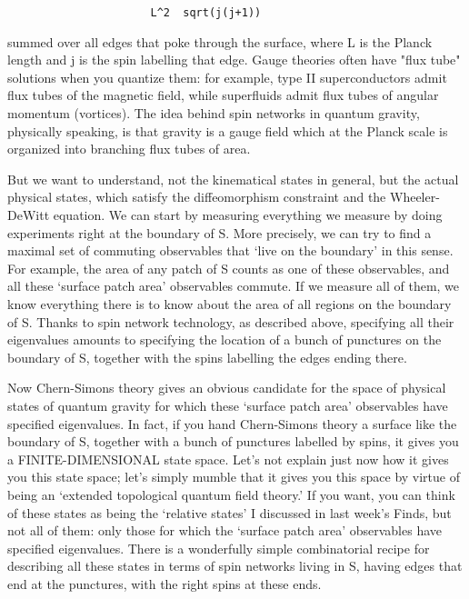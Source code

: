 \begin{verbatim}
                      L^2  sqrt(j(j+1))
\end{verbatim}
    

summed over all edges that poke through the surface, where
L is the Planck length and j is the spin labelling that edge.
Gauge theories often have "flux tube" solutions when you quantize
them: for example, type II superconductors admit flux tubes of
the magnetic field, while superfluids admit flux tubes of
angular momentum (vortices).  The idea behind spin networks in quantum
gravity, physically speaking, is that gravity is a gauge field
which at the Planck scale is organized into branching flux tubes
of area.

But we want to understand, not the kinematical states in general, but
the actual physical states, which satisfy the diffeomorphism constraint
and the Wheeler-DeWitt equation. We can start by measuring everything we
measure by doing experiments right at the boundary of S.  More precisely, we 
can try to find a maximal set of commuting observables that `live on the 
boundary' in this sense.  For example, the area of any patch of S counts 
as one of these observables, and all these `surface patch area' 
observables commute.  If we measure all of them, we know everything 
there is to know about the area of all regions on the 
boundary of S.  Thanks to spin network technology, as described above,
specifying all their eigenvalues amounts to specifying the location of 
a bunch of punctures on the boundary of S, together with the spins 
labelling the edges ending there.

Now Chern-Simons theory gives an obvious candidate for the space of
physical states of quantum gravity for which these `surface patch area' 
observables have specified eigenvalues.  In fact, if you hand Chern-Simons 
theory a surface like the boundary of S, together with a bunch of punctures
labelled by spins, it gives you a FINITE-DIMENSIONAL state space. 
Let's not explain just now how it gives you this state space; let's simply
mumble that it gives you this space by virtue of being an `extended topological
quantum field theory.'  If you want, you can think of these states as being
the `relative states' I discussed in last week's Finds, but not all of them: 
only those for which the `surface patch area' observables have specified 
eigenvalues.   There is a wonderfully simple combinatorial recipe for 
describing all these states in terms of spin networks living in S, having
edges that end at the punctures, with the right spins at these ends.
 
